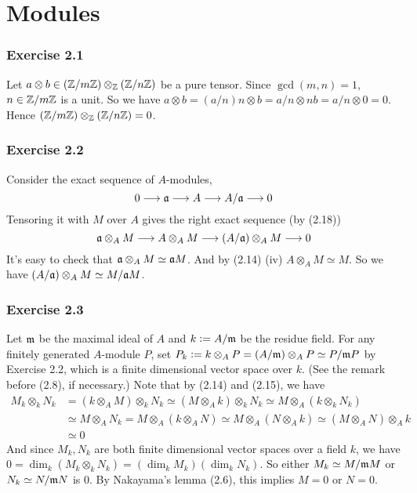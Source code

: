 \documentclass[../A&M.tex]{subfiles}
\begin{document}
\chapter{Modules}

\subsection*{Exercise 2.1}

Let $a \otimes b \in (\mathbb{Z}/m\mathbb{Z}) \otimes_{\mathbb{Z}} (\mathbb{Z}/n\mathbb{Z})$ be a pure tensor. Since $\gcd(m,n)=1$, $n\in \mathbb{Z}/m\mathbb{Z}$ is a unit. So we have $a \otimes b = (a/n)n \otimes b = a/n \otimes nb = a/n \otimes 0 = 0$. Hence $(\mathbb{Z}/m\mathbb{Z}) \otimes_{\mathbb{Z}} (\mathbb{Z}/n\mathbb{Z}) = 0$.

\subsection*{Exercise 2.2}

Consider the exact sequence of $A$-modules,
$$
0 \longrightarrow \mathfrak{a} \longrightarrow A \longrightarrow A/\mathfrak{a} \longrightarrow 0
$$
Tensoring it with $M$ over $A$ gives the right exact sequence (by (2.18))
$$
\mathfrak{a} \otimes_A M \longrightarrow A \otimes_A M \longrightarrow (A/\mathfrak{a}) \otimes_A M \longrightarrow 0
$$
It's easy to check that $\mathfrak{a} \otimes_A M \simeq \mathfrak{a} M$. And by (2.14) (iv) $A \otimes_A M \simeq M$. So we have $(A/\mathfrak{a}) \otimes_A M \simeq M/\mathfrak{a} M$.

\subsection*{Exercise 2.3}

Let $\mathfrak{m}$ be the maximal ideal of $A$ and $k:=A/\mathfrak{m}$ be the residue field. For any finitely generated $A$-module $P$, set $P_k := k \otimes_A P = (A/\mathfrak{m}) \otimes_A P \simeq P/\mathfrak{m} P$ by Exercise 2.2, which is a finite dimensional vector space over $k$. (See the remark before (2.8), if necessary.) Note that by (2.14) and (2.15), we have
\begin{align*}
	M_k \otimes_k N_k
	&= (k \otimes_A M) \otimes_k N_k
	\simeq (M \otimes_A k) \otimes_k N_k
	\simeq M \otimes_A (k \otimes_k N_k)     \\
	&\simeq M \otimes_A N_k
	= M \otimes_A (k \otimes_A N)
	\simeq M \otimes_A (N \otimes_A k)
	\simeq (M \otimes_A N) \otimes_A k    \\
	&\simeq 0	
\end{align*}
And since $M_k,N_k$ are both finite dimensional vector spaces over a field $k$, we have $0 = \dim_k (M_k \otimes_k N_k) = (\dim_k M_k)(\dim_k N_k)$. So either $M_k \simeq M/\mathfrak{m} M$ or $N_k \simeq N/\mathfrak{m} N$ is $0$. By Nakayama's lemma (2.6), this implies $M=0$ or $N=0$.
\end{document}
